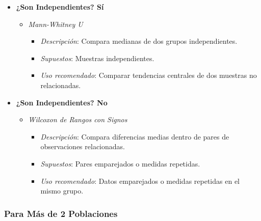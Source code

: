 \documentclass{article}
\begin{document}
\begin{itemize}
    \item \textbf{¿Son Independientes? Sí}
          \begin{itemize}
              \item \textit{Mann-Whitney U}
                    \begin{itemize}
                        \item \textit{Descripción}: Compara medianas de dos grupos independientes.
                        \item \textit{Supuestos}: Muestras independientes.
                        \item \textit{Uso recomendado}: Comparar tendencias centrales de dos muestras no relacionadas.
                    \end{itemize}
          \end{itemize}

    \item \textbf{¿Son Independientes? No}
          \begin{itemize}
              \item \textit{Wilcoxon de Rangos con Signos}
                    \begin{itemize}
                        \item \textit{Descripción}: Compara diferencias medias dentro de pares de observaciones relacionadas.
                        \item \textit{Supuestos}: Pares emparejados o medidas repetidas.
                        \item \textit{Uso recomendado}: Datos emparejados o medidas repetidas en el mismo grupo.
                    \end{itemize}
          \end{itemize}
\end{itemize}

\subsubsection{Para Más de 2 Poblaciones}
\end{document}
